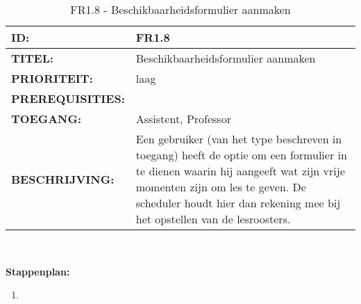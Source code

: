 \noindent\begin{table}[H]
            \begin{tabular}{l | p{10cm}}
                \textbf{ID:} & FR1.8 \\ \hline
                \textbf{TITEL:} & Beschikbaarheidsformulier aanmaken\\ \hline
                \textbf{PRIORITEIT:} &  laag \\ \hline
                \textbf{PREREQUISITIES:} & \\ \hline
                \textbf{TOEGANG:} & Assistent, Professor \\ \hline
                \textbf{BESCHRIJVING:} & Een gebruiker (van het type beschreven in toegang) heeft de optie om een formulier in te dienen waarin hij aangeeft wat zijn vrije momenten zijn om les te geven. De scheduler houdt hier dan rekening mee bij het opstellen van de lesroosters.\\ 
            \end{tabular}\\
            \caption{FR1.8 - Beschikbaarheidsformulier aanmaken}
            \label{tab:FR1.8 - Beschikbaarheidsformulier aanmaken}
        \end{table}

\textbf{Stappenplan:}
\begin{enumerate}
\item 
\end{enumerate}